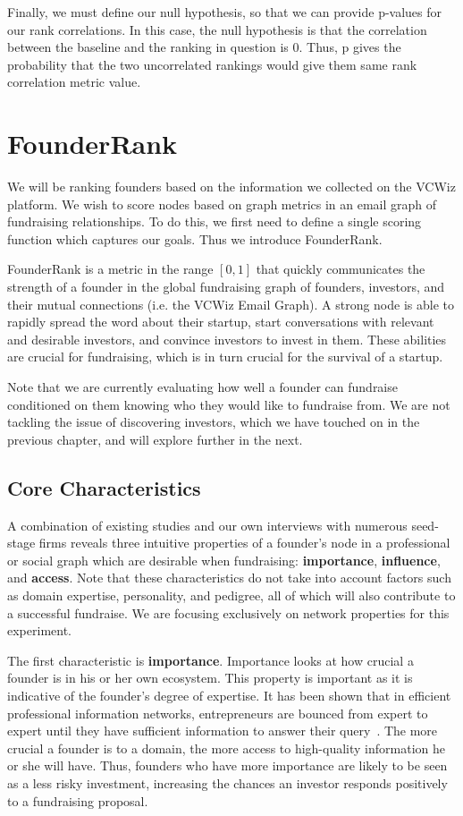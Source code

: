 Finally, we must define our null hypothesis, so that we can provide p-values for our rank correlations. In this case, the null hypothesis is that the correlation between the baseline and the ranking in question is 0. Thus, p gives the probability that the two uncorrelated rankings would give them same rank correlation metric value.

\section{FounderRank}

We will be ranking founders based on the information we collected on the VCWiz platform. We wish to score nodes based on graph metrics in an email graph of fundraising relationships. To do this, we first need to define a single scoring function which captures our goals. Thus we introduce FounderRank.

FounderRank is a metric in the range $[0, 1]$ that quickly communicates the strength of a founder in the global fundraising graph of founders, investors, and their mutual connections (i.e. the VCWiz Email Graph). A strong node is able to rapidly spread the word about their startup, start conversations with relevant and desirable investors, and convince investors to invest in them. These abilities are crucial for fundraising, which is in turn crucial for the survival of a startup.

Note that we are currently evaluating how well a founder can fundraise conditioned on them knowing who they would like to fundraise from. We are not tackling the issue of discovering investors, which we have touched on in the previous chapter, and will explore further in the next.

\subsection{Core Characteristics}

A combination of existing studies and our own interviews with numerous seed-stage firms reveals three intuitive properties of a founder's node in a professional or social graph which are desirable when fundraising: \textbf{importance}, \textbf{influence}, and \textbf{access}. Note that these characteristics do not take into account factors such as domain expertise, personality, and pedigree, all of which will also contribute to a successful fundraise. We are focusing exclusively on network properties for this experiment.

The first characteristic is \textbf{importance}. Importance looks at how crucial a founder is in his or her own ecosystem. This property is important as it is indicative of the founder's degree of expertise. It has been shown that in efficient professional information networks, entrepreneurs are bounced from expert to expert until they have sufficient information to answer their query~\cite{BIRLEY1985107}. The more crucial a founder is to a domain, the more access to high-quality information he or she will have. Thus, founders who have more importance are likely to be seen as a less risky investment, increasing the chances an investor responds positively to a fundraising proposal.

